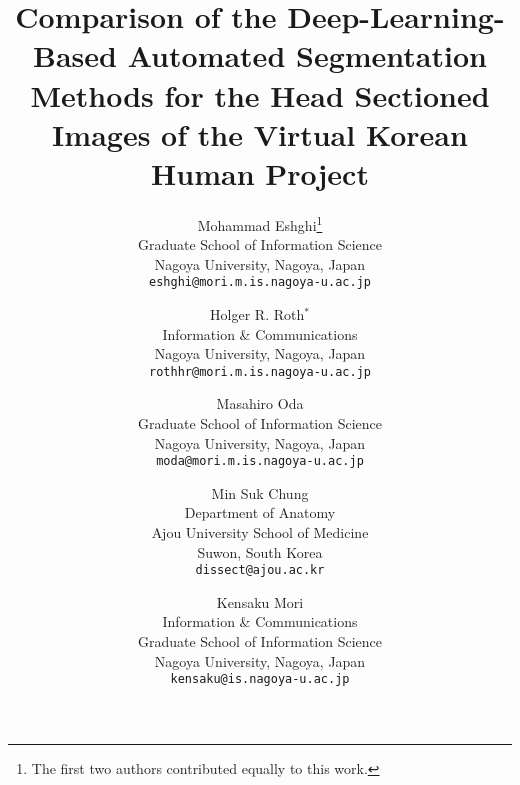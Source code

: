\documentclass[a4paper]{mva_style}
\begin{document}

\title{Comparison of the Deep-Learning-Based Automated Segmentation Methods for the Head Sectioned Images of the Virtual Korean Human Project}



\author{
  Mohammad Eshghi\thanks{The first two authors contributed equally to this work.}\\
  Graduate School of Information Science\\
  Nagoya University, Nagoya, Japan\\
  {\tt eshghi@mori.m.is.nagoya-u.ac.jp}\\
  \and
  Holger R. Roth$^*$\\
  Information \& Communications\\
  Nagoya University, Nagoya, Japan\\
  {\tt rothhr@mori.m.is.nagoya-u.ac.jp}\\
  \and
  Masahiro Oda\\
  Graduate School of Information Science\\
 Nagoya University, Nagoya, Japan\\
  {\tt moda@mori.m.is.nagoya-u.ac.jp}\\
  \and
  Min Suk Chung\\
   Department of Anatomy\\ Ajou University School of Medicine\\
  Suwon, South Korea\\
  {\tt dissect@ajou.ac.kr}\\
  \and
  Kensaku Mori\\
  Information \& Communications\\Graduate School of Information Science\\
  Nagoya University, Nagoya, Japan\\
  {\tt kensaku@is.nagoya-u.ac.jp}\\
}

\maketitle


\end{document}
